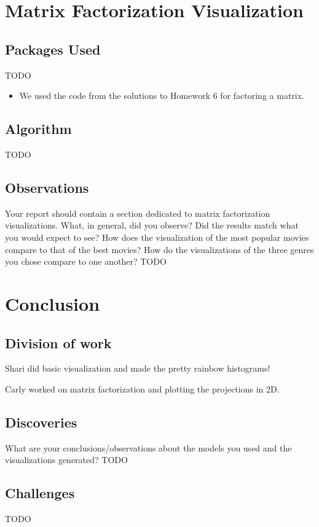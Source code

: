 \newpage

\section{Matrix Factorization Visualization}

\subsection{Packages Used}
TODO
\begin{itemize}
    \item We used the code from the solutions to Homework 6 for factoring a matrix.
\end{itemize}

\subsection{Algorithm}
TODO

\subsection{Observations}
Your report should contain a section dedicated to matrix factorization visualizations. What, in general, did you observe? Did the results match what you would expect to see? How does the visualization of the most popular movies compare to that of the best movies? How do the visualizations of the three genres you chose compare to one another?
TODO



\section{Conclusion}
\subsection{Division of work}
Shari did basic visualization and made the pretty rainbow histograms!

Carly worked on matrix factorization and plotting the projections in 2D.

\subsection{Discoveries}
What are your conclusions/observations about the models you used and the visualizations generated?
TODO

\subsection{Challenges}
TODO

